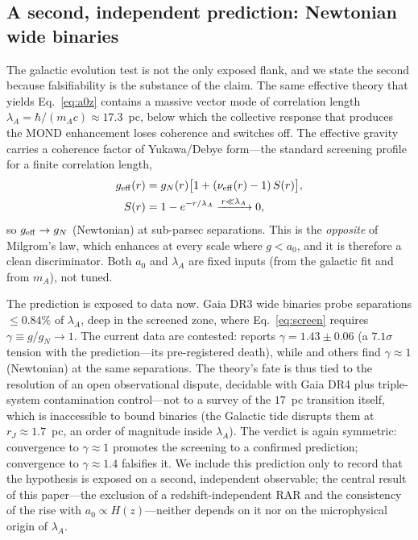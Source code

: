 \documentclass[fleqn,usenatbib]{mnras}
\newcommand{\azero}{a_0}
\begin{document}
\subsection{A second, independent prediction: Newtonian wide binaries}\label{sec:wb}

The galactic evolution test is not the only exposed flank, and we state the second
because falsifiability is the substance of the claim. The same effective theory that
yields Eq.~\eqref{eq:a0z} contains a massive vector mode of correlation length
$\lambda_A=\hbar/(m_A c)\approx17.3$~pc, below which the collective response that
produces the MOND enhancement loses coherence and switches off. The effective
gravity carries a coherence factor of Yukawa/Debye form---the standard screening
profile for a finite correlation length,
\begin{equation}
\begin{aligned}
g_{\rm eff}(r)&=g_N(r)\big[1+(\nu_{\rm eff}(r)-1)\,S(r)\big],\\
S(r)&=1-e^{-r/\lambda_A}\xrightarrow{\,r\ll\lambda_A\,}0,
\end{aligned}
\label{eq:screen}
\end{equation}
so $g_{\rm eff}\to g_N$ (Newtonian) at sub-parsec separations. This is the
\emph{opposite} of Milgrom's law, which enhances at every scale where
$g<\azero$, and it is therefore a clean discriminator. Both $\azero$ and
$\lambda_A$ are fixed inputs (from the galactic fit and from $m_A$), not tuned.

The prediction is exposed to data now. Gaia DR3 wide binaries probe separations
$\le0.84\%$ of $\lambda_A$, deep in the screened zone, where Eq.~\eqref{eq:screen}
requires $\gamma\equiv g/g_N\to1$. The current data are contested:
\citet{Chae2023} reports $\gamma=1.43\pm0.06$ (a $7.1\sigma$ tension with the
prediction---its pre-registered death), while \citet{BanikPittordis2024} and others
find $\gamma\approx1$ (Newtonian) at the same separations. The theory's fate is thus
tied to the resolution of an open observational dispute, decidable with Gaia DR4 plus
triple-system contamination control---not to a survey of the $17$~pc transition
itself, which is inaccessible to bound binaries (the Galactic tide disrupts them at
$r_J\approx1.7$~pc, an order of magnitude inside $\lambda_A$). The verdict is again
symmetric: convergence to $\gamma\approx1$ promotes the screening to a confirmed
prediction; convergence to $\gamma\approx1.4$ falsifies it. We include this prediction
only to record that the hypothesis is exposed on a second, independent observable;
the central result of this paper---the exclusion of a redshift-independent RAR and
the consistency of the rise with $\azero\propto H(z)$---neither depends on it nor on
the microphysical origin of $\lambda_A$.
\end{document}
